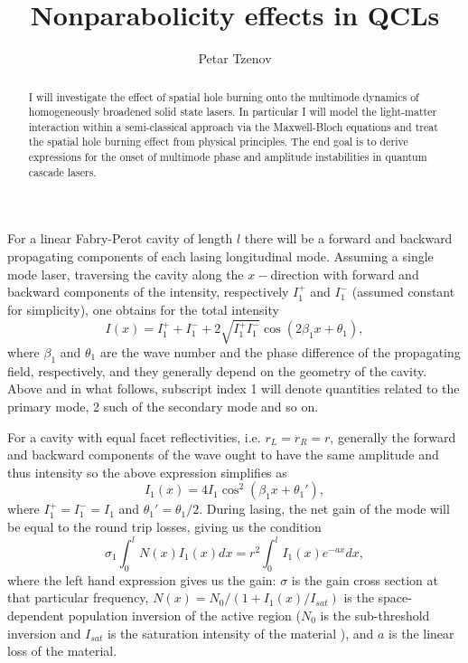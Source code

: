 \documentclass[preprint,secnumarabic,amssymb, nobibnotes, aip, prd]{revtex4-1}
\begin{document}
\title{Nonparabolicity effects in QCLs}%


\author{Petar Tzenov}%
\begin{abstract}
	I will investigate the effect of spatial hole burning onto the multimode dynamics of homogeneously broadened solid state lasers. In particular I will model the light-matter interaction within a semi-classical approach via the Maxwell-Bloch equations and treat the spatial hole burning effect from physical principles. The end goal is to derive expressions for the onset of multimode phase and amplitude instabilities in quantum cascade lasers. 
\end{abstract}
\maketitle
For a linear Fabry-Perot cavity of length $l$ there will be a forward and backward propagating components of each lasing longitudinal mode. Assuming a single mode laser, traversing the cavity along the $x-$direction with forward and backward components of the intensity, respectively $I_1^+$ and $I_1^-$ (assumed constant for simplicity), one obtains for the total intensity 
\begin{equation}
I(x) = I_1^+ + I_1^-+2\sqrt{I_1^+I_1^-}\cos(2\beta_1 x+\theta_1), 
\end{equation} 
where $\beta_1$ and $\theta_1$ are the wave number and the phase difference of the propagating field, respectively, and they generally depend on the geometry of the cavity. Above and in what follows, subscript index 1 will denote quantities related to the primary mode, 2 such of the secondary mode and so on. 

For a cavity with equal facet reflectivities, i.e. $r_L = r_R = r$, generally the forward and backward components of the wave ought to have the same amplitude and thus intensity so the above expression simplifies as 
\begin{equation}
\label{eq:interference}
I_1(x) =4I_1\cos^2(\beta_1 x+\theta_1'),
\end{equation} 
where $I_1^+=I_1^-=I_1$ and $\theta_1'= \theta_1/2$.
During lasing, the net gain of the mode will be equal to the round trip losses, giving us the condition 
\begin{equation}
\label{eq:balance}
\sigma_1\int_{0}^{l} N(x)I_1(x)dx = r^2\int_{0}^{l}I_1(x)e^{-ax}dx,
\end{equation} 
where the left hand expression gives us the gain: $\sigma$ is the gain cross section at that particular frequency, $N(x) = N_0/(1+I_1(x)/I_{sat})$ is the space-dependent population inversion of the active region ($N_0$ is the sub-threshold inversion and $I_{sat}$ is the saturation intensity of the material \cite{siegman1986lasers}),  and $a$ is the linear loss of the material. 
\end{document}
